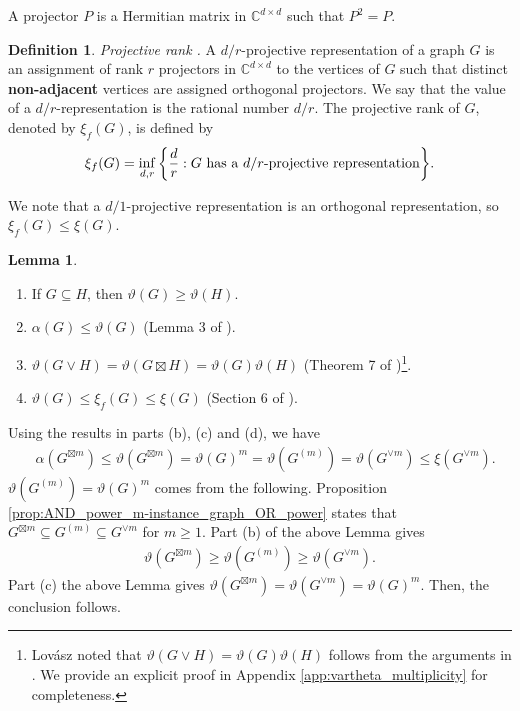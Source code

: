 \documentclass[journal, onecolumn, draftcls]{IEEEtran}
\theoremstyle{definition}
\newtheorem{lemma}{Lemma}
\newtheorem{definition}{Definition}
\newcommand{\bbC}{\mathbb{C}}
\begin{document}
A projector $P$ is a Hermitian matrix in $\bbC^{d\times d}$ such that $P^2=P.$
\begin{definition}{\it Projective rank \cite{Roberson_13}.}  
A $d/r$-projective representation of a graph
$G$ is an assignment of rank $r$ projectors in $\bbC^{d\times d}$ to the vertices of $G$ such that distinct \textbf{non-adjacent}
vertices are assigned orthogonal projectors. We say that the value of a $d/r$-representation
is the rational number $d/r$. The projective rank of $G$, denoted by $\xi_f(G)$, is defined by
\begin{align*}
    \xi_f(G) =\inf_{d,r}\bigg{\{}\frac{d}{r}:G\text{ has a }d/r\text{-projective representation}\bigg{\}}.
\end{align*}
\end{definition} 
We note that a $d/1$-projective representation is an orthogonal representation, so $\xi_f(G)\le \xi(G)$.
\begin{lemma}\label{lemma:lovasz}
\begin{enumerate}[label=(\alph*)]
\item \label{prop:lovasz_number_subgraph}
If $G\subseteq H$, then $\vartheta(G) \ge \vartheta (H)$.
    \item  \label{lemma:lovasz_number_indep_compare}
$\alpha(G)\le \vartheta(G)$ (Lemma 3 of \cite{lovasz1979shannon}). 
\item \label{lemma:lovasz_number_AND_product}
$\vartheta(G\lor H) =\vartheta(G\boxtimes H) = \vartheta(G)\vartheta(H)$ (Theorem 7 of \cite{lovasz1979shannon})\footnote{Lov\'asz noted that $\vartheta(G\lor H) = \vartheta(G)\vartheta(H)$ follows from the arguments in \cite{lovasz1979shannon}. We provide an explicit proof in Appendix \ref{app:vartheta_multiplicity} for completeness.}.
\item $\vartheta(G) \le \xi_f({G})\le \xi({G})$ (Section 6 of  \cite{Mancinska16}).\label{lemma:lovasz_number_xi_compare}
\end{enumerate}
Using the results in parts (b), (c) and (d), we have
\begin{align}
&  \alpha(G^{\boxtimes m}) \le\vartheta(G ^{\boxtimes m}) =   \vartheta(G )^m  = \vartheta(G ^{(m)}) = 
\vartheta(G ^{\lor m})\le \xi(  G ^{\lor m}). \label{eq:sandwich}
\end{align}
$\vartheta(G ^{(m)}) = \vartheta(G )^m  $ comes from the following. Proposition \ref{prop:AND_power_m-instance_graph_OR_power} states that $G^{\boxtimes m} \subseteq G^{(m)} \subseteq G^{\lor m}$ for $m\ge 1$. Part (b) of the above Lemma gives 
\begin{align*}
    \vartheta(G ^{\boxtimes m}) \ge \vartheta(G ^{(m)})  \ge  
\vartheta(G ^{\lor m}).
\end{align*}
Part (c)  the above Lemma gives $ \vartheta(G ^{\boxtimes m})=\vartheta(G ^{\lor m}) = \vartheta(G )^m$. Then, the conclusion follows.
\end{lemma} 
\end{document}
